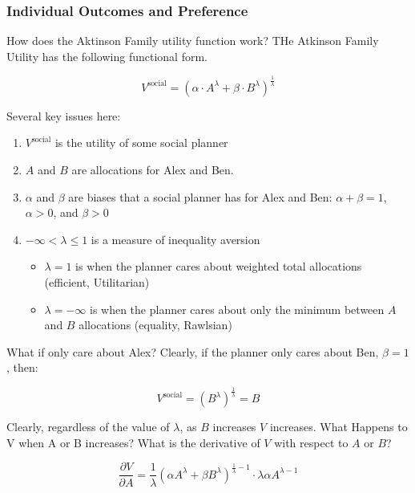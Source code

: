 \documentclass[
]{book}
\providecommand{\tightlist}{%
  \setlength{\itemsep}{0pt}\setlength{\parskip}{0pt}}
\begin{document}
\hypertarget{individual-outcomes-and-preference}{%
\subsubsection{Individual Outcomes and Preference}\label{individual-outcomes-and-preference}}

How does the Aktinson Family utility function work? THe Atkinson Family Utility has the following functional form.

\[
V^{\text{social}}
=
\left(
\alpha
\cdot
A^{\lambda}
+
\beta
\cdot
B^{\lambda}
\right)^{\frac{1}{\lambda}}
\]

Several key issues here:

\begin{enumerate}
\def\labelenumi{\arabic{enumi}.}
\tightlist
\item
  \(V^{\text{social}}\) is the utility of some social planner
\item
  \(A\) and \(B\) are allocations for Alex and Ben.
\item
  \(\alpha\) and \(\beta\) are biases that a social planner has for Alex and Ben: \(\alpha+\beta=1\), \(\alpha>0\), and \(\beta>0\)
\item
  \(-\infty < \lambda \le 1\) is a measure of inequality aversion

  \begin{itemize}
  \tightlist
  \item
    \(\lambda=1\) is when the planner cares about weighted total allocations (efficient, Utilitarian)
  \item
    \(\lambda=-\infty\) is when the planner cares about only the minimum between \(A\) and \(B\) allocations (equality, Rawlsian)
  \end{itemize}
\end{enumerate}

What if only care about Alex? Clearly, if the planner only cares about Ben, \(\beta=1\), then:

\[
V^{\text{social}}
=
\left(
B^{\lambda}
\right)^{\frac{1}{\lambda}}
= B
\]

Clearly, regardless of the value of \(\lambda\), as \(B\) increases \(V\) increases. What Happens to V when A or B increases? What is the derivative of \(V\) with respect to \(A\) or \(B\)?

\[
    \frac{\partial V}{\partial A}
    =
    \frac{1}{\lambda}
    \left(
    \alpha
    A^{\lambda}
    +
    \beta
    B^{\lambda}
    \right)^{\frac{1}{\lambda}-1}
    \cdot
    \lambda
    \alpha
    A^{\lambda -1}
\]
\end{document}
